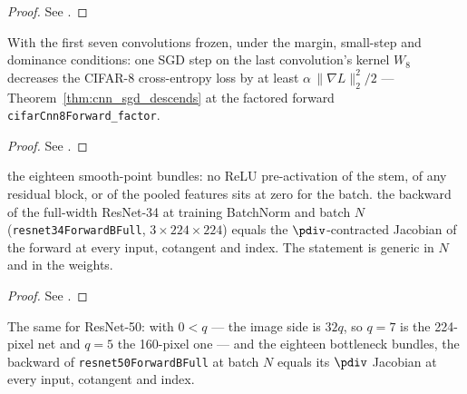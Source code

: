 \begin{proof}
\leanok
See .
\end{proof}

\begin{theorem}
  \label{thm:cifar8_sgd_descends}
  \leanok
  With the first seven convolutions frozen, under the margin, small-step and
  dominance conditions: \Prove{} one SGD step on the last convolution's kernel
  \(W_8\) decreases the CIFAR-8 cross-entropy loss by at least
  \(\alpha\,\|\nabla L\|_2^2/2\) --- Theorem~\ref{thm:cnn_sgd_descends} at
  the factored forward \texttt{cifarCnn8Forward\_factor}.
\end{theorem}

\begin{proof}
\leanok
See .
\end{proof}

\begin{theorem}
  \label{thm:resnet34FullHasVJP}
  \leanok
  \Assume{} the eighteen smooth-point bundles: no ReLU pre-activation of the
  stem, of any residual block, or of the pooled features sits at zero for the
  batch. \Prove{} the backward of the full-width ResNet-34 at training
  BatchNorm and batch \(N\) (\texttt{resnet34ForwardBFull}, \(3 \times 224
  \times 224\)) equals the \(\pdiv\)-contracted Jacobian of the forward at
  every input, cotangent and index. The statement is generic in \(N\) and in
  the weights.
\end{theorem}

\begin{proof}
\leanok
See .
\end{proof}

\begin{theorem}
  \label{thm:resnet50FullHasVJP}
  \leanok
  The same for ResNet-50: with \(0 < q\) --- the image side is \(32q\), so
  \(q = 7\) is the 224-pixel net and \(q = 5\) the 160-pixel one --- and the
  eighteen bottleneck bundles, \Prove{} the backward of
  \texttt{resnet50ForwardBFull} at batch \(N\) equals its \(\pdiv\)
  Jacobian at every input, cotangent and index.
\end{theorem}

